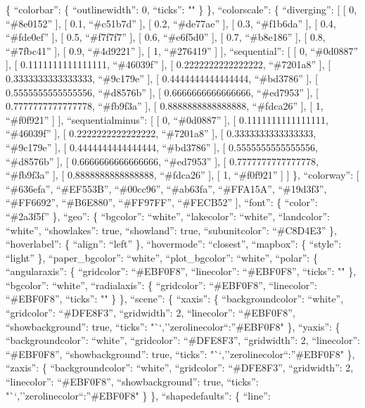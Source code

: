 \documentclass[
]{article}
\begin{document}
\{ ``colorbar'': \{ ``outlinewidth'': 0, ``ticks'': "" \} \},
``colorscale'': \{ ``diverging'': {[} {[} 0, ``\#8e0152'' {]}, {[} 0.1,
``\#c51b7d'' {]}, {[} 0.2, ``\#de77ae'' {]}, {[} 0.3, ``\#f1b6da'' {]},
{[} 0.4, ``\#fde0ef'' {]}, {[} 0.5, ``\#f7f7f7'' {]}, {[} 0.6,
``\#e6f5d0'' {]}, {[} 0.7, ``\#b8e186'' {]}, {[} 0.8, ``\#7fbc41'' {]},
{[} 0.9, ``\#4d9221'' {]}, {[} 1, ``\#276419'' {]} {]}, ``sequential'':
{[} {[} 0, ``\#0d0887'' {]}, {[} 0.1111111111111111, ``\#46039f'' {]},
{[} 0.2222222222222222, ``\#7201a8'' {]}, {[} 0.3333333333333333,
``\#9c179e'' {]}, {[} 0.4444444444444444, ``\#bd3786'' {]}, {[}
0.5555555555555556, ``\#d8576b'' {]}, {[} 0.6666666666666666,
``\#ed7953'' {]}, {[} 0.7777777777777778, ``\#fb9f3a'' {]}, {[}
0.8888888888888888, ``\#fdca26'' {]}, {[} 1, ``\#f0f921'' {]} {]},
``sequentialminus'': {[} {[} 0, ``\#0d0887'' {]}, {[}
0.1111111111111111, ``\#46039f'' {]}, {[} 0.2222222222222222,
``\#7201a8'' {]}, {[} 0.3333333333333333, ``\#9c179e'' {]}, {[}
0.4444444444444444, ``\#bd3786'' {]}, {[} 0.5555555555555556,
``\#d8576b'' {]}, {[} 0.6666666666666666, ``\#ed7953'' {]}, {[}
0.7777777777777778, ``\#fb9f3a'' {]}, {[} 0.8888888888888888,
``\#fdca26'' {]}, {[} 1, ``\#f0f921'' {]} {]} \}, ``colorway'': {[}
``\#636efa'', ``\#EF553B'', ``\#00cc96'', ``\#ab63fa'', ``\#FFA15A'',
``\#19d3f3'', ``\#FF6692'', ``\#B6E880'', ``\#FF97FF'', ``\#FECB52''
{]}, ``font'': \{ ``color'': ``\#2a3f5f'' \}, ``geo'': \{ ``bgcolor'':
``white'', ``lakecolor'': ``white'', ``landcolor'': ``white'',
``showlakes'': true, ``showland'': true, ``subunitcolor'': ``\#C8D4E3''
\}, ``hoverlabel'': \{ ``align'': ``left'' \}, ``hovermode'':
``closest'', ``mapbox'': \{ ``style'': ``light'' \}, ``paper\_bgcolor'':
``white'', ``plot\_bgcolor'': ``white'', ``polar'': \{ ``angularaxis'':
\{ ``gridcolor'': ``\#EBF0F8'', ``linecolor'': ``\#EBF0F8'', ``ticks'':
"" \}, ``bgcolor'': ``white'', ``radialaxis'': \{ ``gridcolor'':
``\#EBF0F8'', ``linecolor'': ``\#EBF0F8'', ``ticks'': "" \} \},
``scene'': \{ ``xaxis'': \{ ``backgroundcolor'': ``white'',
``gridcolor'': ``\#DFE8F3'', ``gridwidth'': 2, ``linecolor'':
``\#EBF0F8'', ``showbackground'': true, ``ticks'':
"``,''zerolinecolor``:''\#EBF0F8" \}, ``yaxis'': \{ ``backgroundcolor'':
``white'', ``gridcolor'': ``\#DFE8F3'', ``gridwidth'': 2, ``linecolor'':
``\#EBF0F8'', ``showbackground'': true, ``ticks'':
"``,''zerolinecolor``:''\#EBF0F8" \}, ``zaxis'': \{ ``backgroundcolor'':
``white'', ``gridcolor'': ``\#DFE8F3'', ``gridwidth'': 2, ``linecolor'':
``\#EBF0F8'', ``showbackground'': true, ``ticks'':
"``,''zerolinecolor``:''\#EBF0F8" \} \}, ``shapedefaults'': \{ ``line'':
\end{document}
